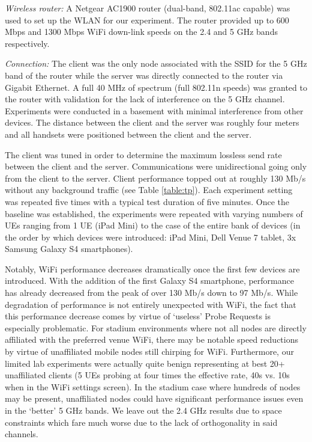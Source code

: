 \documentclass[conference]{IEEEtran}
\begin{document}
\emph{Wireless router:} A Netgear AC1900 router (dual-band, 802.11ac capable) was used to set up the WLAN for our experiment. The router provided up to 600 Mbps and 1300 Mbps WiFi down-link speeds on the 2.4 and 5 GHz bands respectively.  
	
\emph{Connection:} The client was the only node associated with the SSID for the 5 GHz band of the router while the server was directly connected to the router via Gigabit Ethernet. A full 40 MHz of spectrum (full 802.11n speeds) was granted to the router with validation for the lack of interference on the 5 GHz channel.  Experiments were conducted in a basement with minimal interference from other devices.  The distance between the client and the server was roughly four meters and all handsets were positioned between the client and the server.   

The client was tuned in order to determine the maximum lossless send rate between the client and the server. Communications were unidirectional going only from the client to the server. Client performance topped out at roughly 130 Mb/s without any background traffic (see Table \ref{table:tp}). Each experiment setting was repeated five times with a typical test duration of five minutes. Once the baseline was established, the experiments were repeated with varying numbers of UEs ranging from 1 UE (iPad Mini) to the case of the entire bank of devices (in the order by which devices were introduced: iPad Mini, Dell Venue 7 tablet, 3x Samsung Galaxy S4 smartphones). 

Notably, WiFi performance decreases dramatically once the first few devices are introduced. With the addition of the first Galaxy S4 smartphone, performance has already decreased from the peak of over 130 Mb/s down to 97 Mb/s. While degradation of performance is not entirely unexpected with WiFi, the fact that this performance decrease comes by virtue of `useless' Probe Requests is especially problematic. For stadium environments where not all nodes are directly affiliated with the preferred venue WiFi, there may be notable speed reductions by virtue of unaffiliated mobile nodes still chirping for WiFi. Furthermore, our limited lab experiments were actually quite benign representing at best 20+ unaffiliated clients (5 UEs probing at four times the effective rate, 40s vs. 10s when in the WiFi settings screen). In the stadium case where hundreds of nodes may be present, unaffiliated nodes could have significant performance issues even in the `better' 5 GHz bands. We leave out the 2.4 GHz results due to space constraints which fare much worse due to the lack of orthogonality in said channels.            
\end{document}
